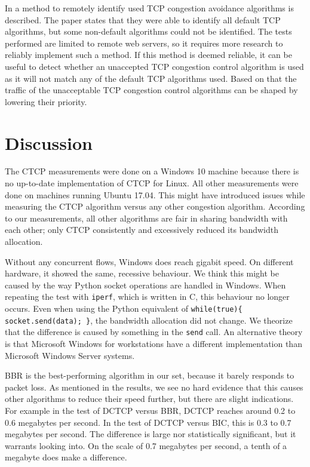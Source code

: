 \documentclass{article}
\begin{document}
In \cite{tcp-congestion-identification} a method to remotely identify used TCP congestion avoidance algorithms is described. The paper states that 
they were able to identify all default TCP algorithms, but some non-default algorithms could not be identified. The tests performed are limited to remote web servers, so it requires more research to reliably implement such a method. If this method is deemed reliable, it can be useful to detect whether an unaccepted TCP congestion control algorithm is used as it will not match any of the default TCP algorithms used. Based on that the traffic of the unacceptable TCP congestion control algorithms can be shaped by lowering their priority.


\section{Discussion}\label{sec:discussion}

The CTCP measurements were done on a Windows 10 machine because there is no
up-to-date implementation of CTCP for Linux. All other measurements were done
on machines running Ubuntu 17.04. This might have introduced issues while
measuring the CTCP algorithm versus any other congestion algorithm. According
to our measurements, all other algorithms are fair in sharing bandwidth with
each other; only CTCP consistently and excessively reduced its bandwidth
allocation.

Without any concurrent flows, Windows does reach gigabit speed. On different
hardware, it showed the same, recessive behaviour. We think this might be
caused by the way Python socket operations are handled in Windows. When
repeating the test with \texttt{iperf}, which is written in C, this behaviour
no longer occurs. Even when using the Python equivalent of
\texttt{while(true)\{ socket.send(data); \}}, the bandwidth allocation did not
change. We theorize that the difference is caused by something in the
\texttt{send} call. An alternative theory is that Microsoft Windows for
workstations have a different implementation than Microsoft Windows Server
systems.

BBR is the best-performing algorithm in our set, because it barely responds to
packet loss. As mentioned in the results, we see no hard evidence that this
causes other algorithms to reduce their speed further, but there are slight
indications. For example in the test of DCTCP versus BBR, DCTCP reaches around
0.2 to 0.6 megabytes per second. In the test of DCTCP versus BIC, this is 0.3
to 0.7 megabytes per second. The difference is large nor statistically
significant, but it warrants looking into. On the scale of 0.7 megabytes per
second, a tenth of a megabyte does make a difference.
\end{document}

